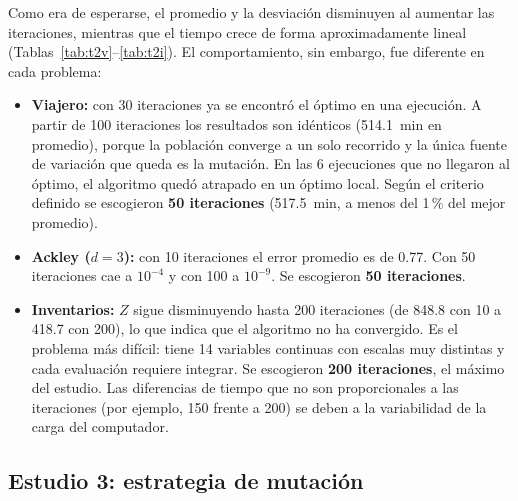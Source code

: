 \documentclass[conference]{IEEEtran}
\begin{document}
Como era de esperarse, el promedio y la desviaci\'on disminuyen al aumentar las iteraciones, mientras que el tiempo crece de forma aproximadamente lineal (Tablas~\ref{tab:t2v}--\ref{tab:t2i}). El comportamiento, sin embargo, fue diferente en cada problema:
\begin{itemize}
\item \textbf{Viajero:} con 30 iteraciones ya se encontr\'o el \'optimo en una ejecuci\'on. A partir de 100 iteraciones los resultados son id\'enticos (514.1~min en promedio), porque la poblaci\'on converge a un solo recorrido y la \'unica fuente de variaci\'on que queda es la mutaci\'on. En las 6 ejecuciones que no llegaron al \'optimo, el algoritmo qued\'o atrapado en un \'optimo local. Seg\'un el criterio definido se escogieron \textbf{50 iteraciones} (517.5~min, a menos del 1\,\% del mejor promedio).
\item \textbf{Ackley ($d=3$):} con 10 iteraciones el error promedio es de 0.77. Con 50 iteraciones cae a $10^{-4}$ y con 100 a $10^{-9}$. Se escogieron \textbf{50 iteraciones}.
\item \textbf{Inventarios:} $Z$ sigue disminuyendo hasta 200 iteraciones (de 848.8 con 10 a 418.7 con 200), lo que indica que el algoritmo no ha convergido. Es el problema m\'as dif\'icil: tiene 14 variables continuas con escalas muy distintas y cada evaluaci\'on requiere integrar. Se escogieron \textbf{200 iteraciones}, el m\'aximo del estudio. Las diferencias de tiempo que no son proporcionales a las iteraciones (por ejemplo, 150 frente a 200) se deben a la variabilidad de la carga del computador.
\end{itemize}

\subsection{Estudio 3: estrategia de mutaci\'on}



\end{document}
